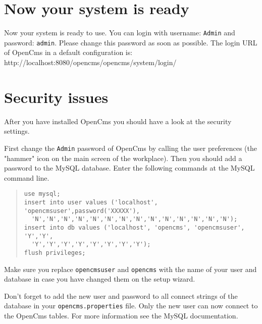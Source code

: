 \section{Now your system is ready}
Now your system is ready to use. You can login with username:
\texttt{Admin} and password: \texttt{admin}. Please change this
password as soon as possible. The login URL of OpenCms in a default configuration is:\\
{http://localhost:8080/opencms/opencms/system/login/}

\section{Security issues}
After you have installed OpenCms you should have a look at the security settings.

First change the \texttt{Admin} password of OpenCms by calling the user
preferences (the "hammer" icon on the main screen of the workplace).
Then you should add a password to the MySQL database. Enter the following
commands at the MySQL command line.\\

\begin{quote}
\begin{verbatim}
use mysql;
insert into user values ('localhost', 'opencmsuser',password('XXXXX'),
  'N','N','N','N','N','N','N','N','N','N','N','N','N','N');
insert into db values ('localhost', 'opencms', 'opencmsuser', 'Y','Y',
  'Y','Y','Y','Y','Y','Y','Y','Y');
flush privileges;
\end{verbatim}
\end{quote}

Make sure you replace \texttt{opencmsuser} and \texttt{opencms} with the name of your user and database 
in case you have changed them on the setup wizard.

Don't forget to add the new user and password to all connect
strings of the database in your \texttt{opencms.properties} file. 
Only the new user can now connect to the OpenCms tables. For more
information see the MySQL documentation.
